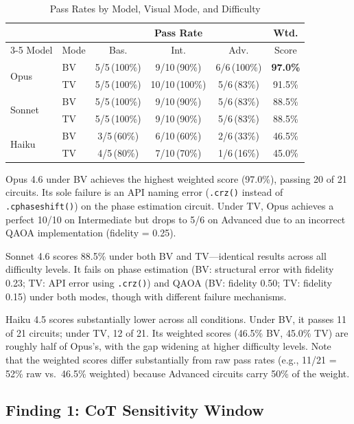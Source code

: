 \documentclass[conference]{IEEEtran}
\begin{document}
\begin{table}[t]
\centering
\caption{Pass Rates by Model, Visual Mode, and Difficulty}
\label{tab:results}
\footnotesize
\begin{tabular}{@{}ll ccc c@{}}
\toprule
 & & \multicolumn{3}{c}{Pass Rate} & Wtd. \\
\cmidrule(lr){3-5}
Model & Mode & Bas. & Int. & Adv. & Score \\
\midrule
\multirow{2}{*}{Opus}
  & BV & 5/5\,(100\%) & 9/10\,(90\%)  & 6/6\,(100\%) & \textbf{97.0\%} \\
  & TV & 5/5\,(100\%) & 10/10\,(100\%) & 5/6\,(83\%)  & 91.5\% \\
\midrule
\multirow{2}{*}{Sonnet}
  & BV & 5/5\,(100\%) & 9/10\,(90\%)  & 5/6\,(83\%)  & 88.5\% \\
  & TV & 5/5\,(100\%) & 9/10\,(90\%)  & 5/6\,(83\%)  & 88.5\% \\
\midrule
\multirow{2}{*}{Haiku}
  & BV & 3/5\,(60\%)  & 6/10\,(60\%)  & 2/6\,(33\%)  & 46.5\% \\
  & TV & 4/5\,(80\%)  & 7/10\,(70\%)  & 1/6\,(16\%)  & 45.0\% \\
\bottomrule
\end{tabular}
\end{table}

Opus 4.6 under BV achieves the highest weighted score (97.0\%), passing 20 of 21 circuits. Its sole failure is an API naming error (\texttt{.crz()} instead of \texttt{.cphaseshift()}) on the phase estimation circuit. Under TV, Opus achieves a perfect 10/10 on Intermediate but drops to 5/6 on Advanced due to an incorrect QAOA implementation (fidelity = 0.25).

Sonnet 4.6 scores 88.5\% under both BV and TV---identical results across all difficulty levels. It fails on phase estimation (BV: structural error with fidelity 0.23; TV: API error using \texttt{.crz()}) and QAOA (BV: fidelity 0.50; TV: fidelity 0.15) under both modes, though with different failure mechanisms.

Haiku 4.5 scores substantially lower across all conditions. Under BV, it passes 11 of 21 circuits; under TV, 12 of 21. Its weighted scores (46.5\% BV, 45.0\% TV) are roughly half of Opus's, with the gap widening at higher difficulty levels. Note that the weighted scores differ substantially from raw pass rates (e.g., 11/21 = 52\% raw vs.\ 46.5\% weighted) because Advanced circuits carry 50\% of the weight.


\subsection{Finding 1: CoT Sensitivity Window}
\end{document}
